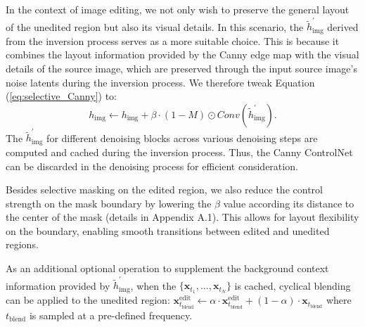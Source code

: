 \documentclass{article}
\newenvironment{cyanpar}{\color{cyan}}{}
\begin{document}
In the context of image editing, we not only wish to preserve the general layout of the unedited region but also its visual details. In this scenario, the $\tilde{h}^{\prime}_{\text{img}}$ derived from the inversion process serves as a more suitable choice. This is because it combines the layout information provided by the Canny edge map with the visual details of the source image, which are preserved through the input source image's noise latents during the inversion process. We therefore tweak Equation (\ref{eq:selective_Canny}) to:
\begin{equation}
h_{\text{img}} \leftarrow h_{\text{img}} + \beta\cdot (1-M) \odot Conv(\tilde{h}^{\prime}_{\text{img}}).
\label{eq:selective_Canny2}
\end{equation}
The $\tilde{h}^{\prime}_{\text{img}}$ for different denoising blocks across various denoising steps are computed and cached during the inversion process. Thus, the Canny ControlNet can be discarded in the denoising process for efficient consideration.

\begin{cyanpar}
Besides selective masking on the edited region, we also reduce the control strength on the mask boundary by lowering the $\beta$ value according its distance to the center of the mask (details in Appendix A.1). This allows for layout flexibility on the boundary, enabling smooth transitions between edited and unedited regions.  


As an additional optional operation to supplement the background context information provided by $\tilde{h}^{\prime}_{\text{img}}$, when the $\{\mathbf{x}_{t_{1}},...,\mathbf{x}_{t_{N}}\}$ is cached, cyclical blending can be applied to the unedited region:  $\mathbf{x}^\text{edit}_{t_\text{blend}}\leftarrow \alpha\cdot\mathbf{x}^\text{edit}_{t_\text{blend}}+(1-\alpha)\cdot\mathbf{x}_{t_\text{blend}}$ where $t_\text{blend}$ is sampled at a pre-defined frequency.



\end{cyanpar}
\end{document}
